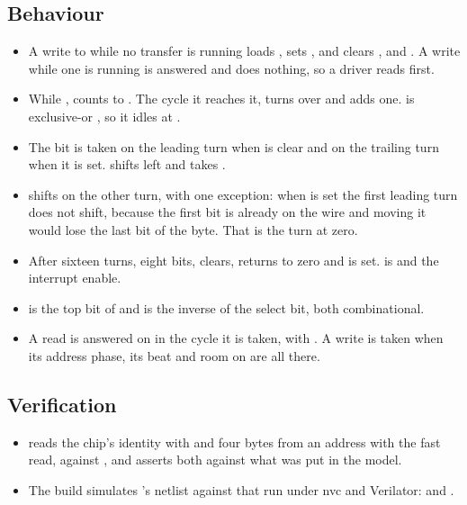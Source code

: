 
\subsection*{Behaviour}

\begin{itemize}
\item A write to  while no transfer is running loads
, sets , and clears ,  and
. A write while one is running is answered and does
nothing, so a driver reads  first.
\item While ,  counts to . The cycle
it reaches it,  turns over and  adds one.
 is  exclusive-or , so it idles at
.
\item The bit is taken on the leading turn when  is clear
and on the trailing turn when it is set.  shifts left and
takes .
\item {} shifts on the other turn, with one exception: when
 is set the first leading turn does not shift, because the
first bit is already on the wire and moving it would lose the last bit
of the byte. That is the turn at  zero.
\item After sixteen turns, eight bits,  clears,
 returns to zero and  is set.  is
 and the interrupt enable.
\item {} is the top bit of  and  is the
inverse of the select bit, both combinational.
\item A read is answered on  in the cycle it is taken, with
. A write is taken when its address phase, its beat and
room on  are all there.
\end{itemize}

\subsection*{Verification}

\begin{itemize}
\item {} reads the chip's identity with
 and four bytes from an address with the  fast
read, against , and asserts both against what was
put in the model.
\item The build simulates 's netlist against that run under
nvc and Verilator:  and
.
\end{itemize}


